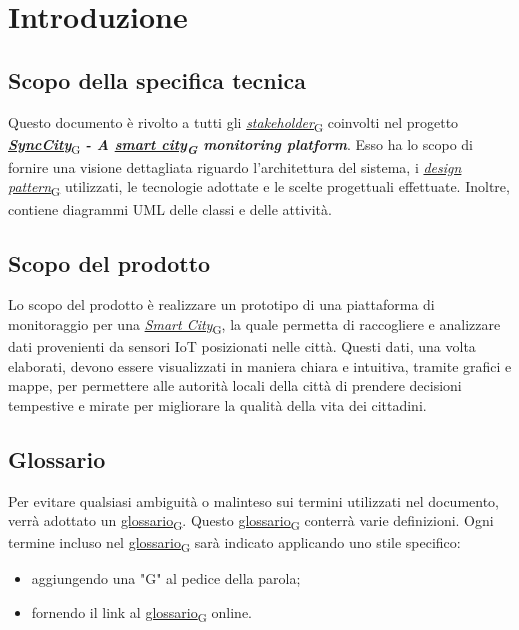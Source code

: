 \section{Introduzione}
\setcounter{subsection}{0}
\subsection{Scopo della specifica tecnica}
Questo documento è rivolto a tutti gli \href{https://7last.github.io/docs/pb/documentazione-interna/glossario\#stakeholder}{\textit{stakeholder}\textsubscript{G}} coinvolti nel progetto \href{https://7last.github.io/docs/pb/documentazione-interna/glossario\#synccity}{\textit{\textbf{SyncCity}}}\textsubscript{G}\textbf{\textit{ - A \href{https://7last.github.io/docs/pb/documentazione-interna/glossario\#smart-city}{smart city\textsubscript{G}} monitoring platform}}.
Esso ha lo scopo di fornire una visione dettagliata riguardo l'architettura del sistema, i \href{https://7last.github.io/docs/pb/documentazione-interna/glossario\#design-pattern}{\textit{design pattern}\textsubscript{G}} utilizzati, le tecnologie adottate e le scelte progettuali effettuate.
Inoltre, contiene diagrammi UML delle classi e delle attività.

\subsection{Scopo del prodotto}
Lo scopo del prodotto è realizzare un prototipo di una piattaforma di monitoraggio per una \href{https://7last.github.io/docs/pb/documentazione-interna/glossario\#smart-city}{\textit{Smart City}\textsubscript{G}}, la quale permetta di raccogliere e analizzare dati provenienti da sensori IoT posizionati nelle città.
Questi dati, una volta elaborati, devono essere visualizzati in maniera chiara e intuitiva, tramite grafici e mappe, per permettere alle autorità locali della città di prendere decisioni
tempestive e mirate per migliorare la qualità della vita dei cittadini.

\subsection{Glossario}
Per evitare qualsiasi ambiguità o malinteso sui termini utilizzati nel documento, verrà adottato un \href{https://7last.github.io/docs/pb/documentazione-interna/glossario\#glossario}{glossario\textsubscript{G}}. Questo \href{https://7last.github.io/docs/pb/documentazione-interna/glossario\#glossario}{glossario\textsubscript{G}} conterrà varie definizioni. Ogni termine incluso nel \href{https://7last.github.io/docs/pb/documentazione-interna/glossario\#glossario}{glossario\textsubscript{G}} sarà indicato applicando uno stile specifico:
\begin{itemize}
	\item aggiungendo una "G" al pedice della parola;
	\item fornendo il link al \href{https://7last.github.io/docs/pb/documentazione-interna/glossario\#glossario}{glossario\textsubscript{G}} online.
\end{itemize}

